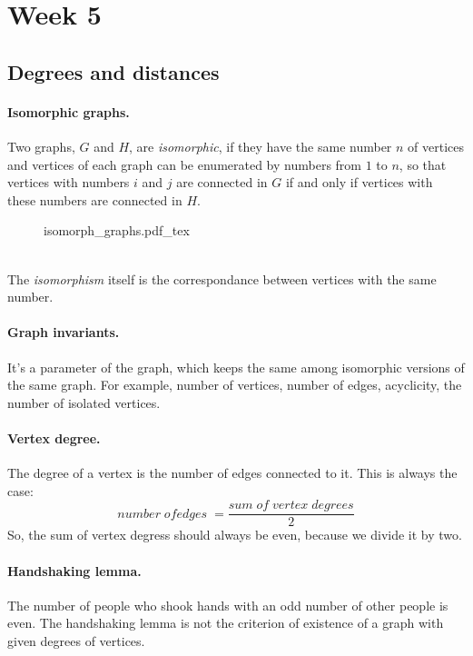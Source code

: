 \documentclass{article}
\newcommand{\incfig}[2][1]{%
    \def\svgwidth{#1\columnwidth}
    {#2.pdf_tex}
}
\begin{document}
\newpage

\section{Week 5}

\subsection{Degrees and distances}

\paragraph{Isomorphic graphs.}
Two graphs, $G$ and $H$, are {\it isomorphic}, if they have the same number $n$ of vertices and vertices of each graph can be enumerated by numbers from $1$ to $n$, so that vertices with numbers $i$ and $j$ are connected in $G$ if and only if vertices with these numbers are connected in $H$.
\begin{figure}[h!]
  \centering
  \incfig{isomorph_graphs}
\end{figure}
\\
The {\it isomorphism} itself is the correspondance between vertices with the same number.

\paragraph{Graph invariants.}
It's a parameter of the graph, which keeps the same among isomorphic versions of the same graph. For example, number of vertices, number of edges, acyclicity, the number of isolated vertices.

\paragraph{Vertex degree.}
The degree of a vertex is the number of edges connected to it. This is always the case:
\[
number \; of edges \; = \frac{sum \; of \; vertex \; degrees}{2}
\]
So, the sum of vertex degress should always be even, because we divide it by two.

\paragraph{Handshaking lemma.}
The number of people who shook hands with an odd number of other people is even. The handshaking lemma is not the criterion of existence of a graph with given degrees of vertices.
\end{document}
